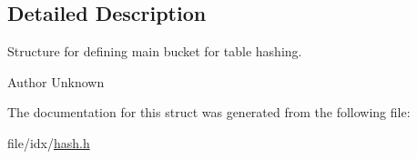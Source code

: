 \subsection{Detailed Description}
Structure for defining main bucket for table hashing. 

\begin{DoxyAuthor}{Author}
Unknown 
\end{DoxyAuthor}


The documentation for this struct was generated from the following file\+:\begin{DoxyCompactItemize}
\item 
file/idx/\hyperlink{hash_8h}{hash.\+h}\end{DoxyCompactItemize}
